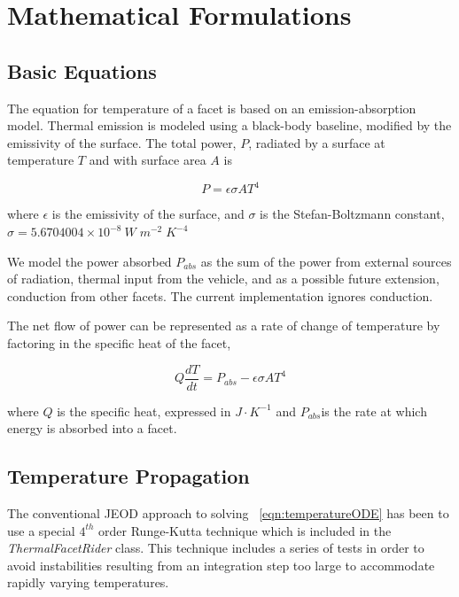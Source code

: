 %
%
% 
%

\section{Mathematical Formulations}

\subsection{Basic Equations}

The equation for temperature of a facet is based on an emission-absorption
model.  Thermal emission is modeled using a black-body baseline, modified by the
emissivity of the surface.  The total power, $P$, radiated by a surface
at temperature $T$ and with surface area $A$ is 

\begin{equation}\label{eqn:thermalemission}
P = \epsilon \sigma A T^4 
\end{equation}

where $\epsilon$ is the emissivity of the surface, 
and $\sigma$ is the Stefan-Boltzmann constant, $\sigma = 5.6704004 \times
10^{-8} \ W \; m^{-2} \; K^{-4}$

We model the power absorbed $P_{abs}$ as the sum of the power from external
sources of radiation, thermal input from the vehicle, and as a possible future
extension, conduction from other facets.  The current implementation ignores
conduction.

The net flow of power can be represented as a rate of change of temperature by
factoring in the specific heat of the facet,

\begin{equation}\label{eqn:temperatureODE}
Q \frac{dT}{dt} = P_{abs} - \epsilon \sigma A T^4
\end{equation}

where $Q$ is the specific heat, expressed in  $J \cdot K^{-1}$
and $P_{abs}$is the rate at which energy 
is absorbed into a facet.

\subsection {Temperature Propagation}

 The conventional JEOD approach to solving ~\ref{eqn:temperatureODE} has been
to use a special $4^{th}$ order Runge-Kutta technique which is included in the 
\textit{ThermalFacetRider} class.  This technique includes a series of tests
in order to avoid instabilities resulting from an integration step too large
to accommodate rapidly varying temperatures.

